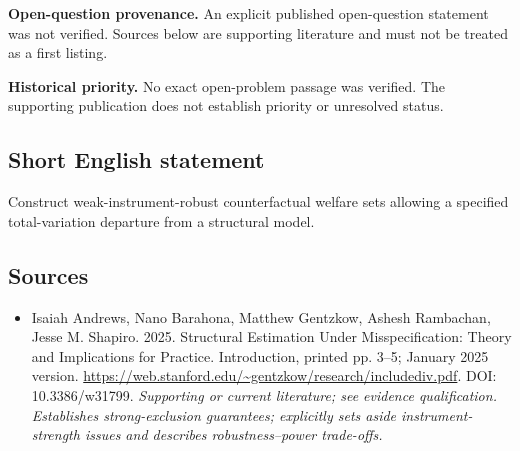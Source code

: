 \documentclass[11pt]{article}
\begin{document}
\par\textbf{Open-question provenance.} An explicit published open-question statement was not verified. Sources below are supporting literature and must not be treated as a first listing.

\par\textbf{Historical priority.} No exact open-problem passage was verified. The supporting publication does not establish priority or unresolved status.

\subsection{Short English statement}
Construct weak-instrument-robust counterfactual welfare sets allowing a specified total-variation departure from a structural model.

\subsection{Sources}
\begin{itemize}\raggedright
\item[\textnormal{[S1]}]\hypertarget{source:30007708:1}{} Isaiah Andrews, Nano Barahona, Matthew Gentzkow, Ashesh Rambachan, Jesse M. Shapiro. 2025. Structural Estimation Under Misspecification: Theory and Implications for Practice. Introduction, printed pp. 3–5; January 2025 version.
\url{https://web.stanford.edu/~gentzkow/research/includediv.pdf}.
DOI: 10.3386/w31799.
{\small\textit{Supporting or current literature; see evidence qualification. Establishes strong-exclusion guarantees; explicitly sets aside instrument-strength issues and describes robustness–power trade-offs.}}
\end{itemize}
\end{document}
